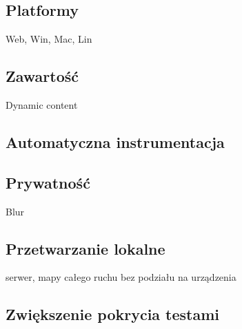 \subsection{Platformy}
Web, Win, Mac, Lin 

\subsection{Zawartość}
Dynamic content

\subsection{Automatyczna instrumentacja}
\label{sec:auto_instrumentation}

\subsection{Prywatność}
Blur

\subsection{Przetwarzanie lokalne}
serwer, mapy całego ruchu bez podziału na urządzenia

\subsection{Zwiększenie pokrycia testami}
\label{sec:future_coverage}
